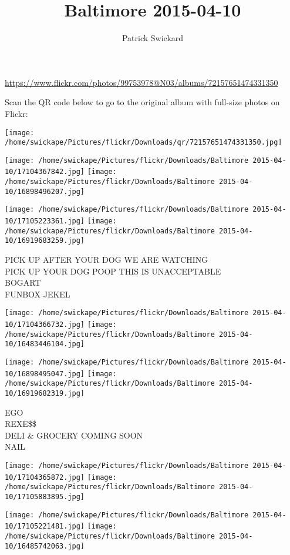 \documentclass[10pt,letterpaper]{article}
\title{Baltimore 2015-04-10}
\author{Patrick Swickard}
\date{}
\begin{document}
\maketitle

\url{https://www.flickr.com/photos/99753978@N03/albums/72157651474331350}

Scan the QR code below to go to the original album with full-size photos on Flickr:

\texttt{[image: /home/swickape/Pictures/flickr/Downloads/qr/72157651474331350.jpg]}
\pagebreak

\texttt{[image: /home/swickape/Pictures/flickr/Downloads/Baltimore 2015-04-10/17104367842.jpg]}
\texttt{[image: /home/swickape/Pictures/flickr/Downloads/Baltimore 2015-04-10/16898496207.jpg]}

\texttt{[image: /home/swickape/Pictures/flickr/Downloads/Baltimore 2015-04-10/17105223361.jpg]}
\texttt{[image: /home/swickape/Pictures/flickr/Downloads/Baltimore 2015-04-10/16919683259.jpg]}

PICK UP AFTER YOUR DOG WE ARE WATCHING\\
PICK UP YOUR DOG POOP THIS IS UNACCEPTABLE\\
BOGART\\
FUNBOX JEKEL
\pagebreak

\texttt{[image: /home/swickape/Pictures/flickr/Downloads/Baltimore 2015-04-10/17104366732.jpg]}
\texttt{[image: /home/swickape/Pictures/flickr/Downloads/Baltimore 2015-04-10/16483446104.jpg]}

\texttt{[image: /home/swickape/Pictures/flickr/Downloads/Baltimore 2015-04-10/16898495047.jpg]}
\texttt{[image: /home/swickape/Pictures/flickr/Downloads/Baltimore 2015-04-10/16919682319.jpg]}

EGO\\
REXE\$\$\\
DELI \& GROCERY COMING SOON\\
NAIL
\pagebreak

\texttt{[image: /home/swickape/Pictures/flickr/Downloads/Baltimore 2015-04-10/17104365872.jpg]}
\texttt{[image: /home/swickape/Pictures/flickr/Downloads/Baltimore 2015-04-10/17105883895.jpg]}

\texttt{[image: /home/swickape/Pictures/flickr/Downloads/Baltimore 2015-04-10/17105221481.jpg]}
\texttt{[image: /home/swickape/Pictures/flickr/Downloads/Baltimore 2015-04-10/16485742063.jpg]}
\end{document}
